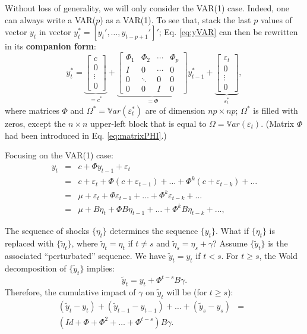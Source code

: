 \documentclass[
  12pt,
]{book}
\theoremstyle{definition}
\theoremstyle{definition}
\theoremstyle{definition}
\theoremstyle{definition}
\theoremstyle{remark}
\begin{document}
Without loss of generality, we will only consider the VAR(1) case. Indeed, one can always write a VAR(\(p\)) as a VAR(1). To see that, stack the last \(p\) values of vector \(y_t\) in vector \(y_{t}^{*}=[y_t',\dots,y_{t-p+1}']'\); Eq. \eqref{eq:yVAR} can then be rewritten in its \textbf{companion form}:
\begin{equation}
y_{t}^{*} =
\underbrace{\left[\begin{array}{c}
c\\
0\\
\vdots\\
0\end{array}\right]}_{=c^*}+
\underbrace{\left[\begin{array}{cccc}
\Phi_{1} & \Phi_{2} & \cdots & \Phi_{p}\\
I & 0 & \cdots & 0\\
0 & \ddots & 0 & 0\\
0 & 0 & I & 0\end{array}\right]}_{=\Phi}
y_{t-1}^{*}+
\underbrace{\left[\begin{array}{c}
\varepsilon_{t}\\
0\\
\vdots\\
0\end{array}\right]}_{\varepsilon_t^*},\label{eq:ystarVAR}
\end{equation}
where matrices \(\Phi\) and \(\Omega^* = \mathbb{V}ar(\varepsilon_t^*)\) are of dimension \(np \times np\); \(\Omega^*\) is filled with zeros, except the \(n\times n\) upper-left block that is equal to \(\Omega = \mathbb{V}ar(\varepsilon_t)\). (Matrix \(\Phi\) had been introduced in Eq. \eqref{eq:matrixPHI}.)

Focusing on the VAR(1) case:
\begin{eqnarray*}
y_{t} &=& c+\Phi y_{t-1}+\varepsilon_{t}\\
& = & c+\varepsilon_{t}+\Phi(c+\varepsilon_{t-1})+\ldots+\Phi^{k}(c+\varepsilon_{t-k})+\ldots \\
& = & \mu +\varepsilon_{t}+\Phi\varepsilon_{t-1}+\ldots+\Phi^{k}\varepsilon_{t-k}+\ldots \\
& = & \mu +B\eta_{t}+\Phi B\eta_{t-1}+\ldots+\Phi^{k}B\eta_{t-k}+\ldots,
\end{eqnarray*}

The sequence of shocks \(\{\eta_t\}\) determines the sequence \(\{y_t\}\). What if \(\{\eta_t\}\) is replaced with \(\{\tilde{\eta}_t\}\), where \(\tilde{\eta}_t=\eta_t\) if \(t \ne s\) and \(\tilde{\eta}_s=\eta_s + \gamma\)? Assume \(\{\tilde{y}_t\}\) is the associated ``perturbated'' sequence. We have \(\tilde{y}_t = y_t\) if \(t<s\). For \(t \ge s\), the Wold decomposition of \(\{\tilde{y}_t\}\) implies:
\[
\tilde{y}_t = y_t + \Phi^{t-s} B \gamma.
\]
Therefore, the cumulative impact of \(\gamma\) on \(\tilde{y}_t\) will be (for \(t \ge s\)):
\begin{eqnarray}
(\tilde{y}_t - y_t) +  (\tilde{y}_{t-1} - y_{t-1}) + \dots +  (\tilde{y}_s - y_s) &=& \nonumber \\
(Id + \Phi + \Phi^2 + \dots + \Phi^{t-s}) B \gamma.&& \label{eq:cumul}
\end{eqnarray}
\end{document}
